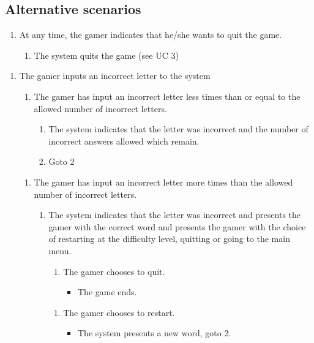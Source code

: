 \documentclass[12pt, letterpaper]{article}
\begin{document}
\subsection{Alternative scenarios}
\begin{enumerate}[label=a*.]
	\item At any time, the gamer indicates that he/she wants to quit the game.
	\begin{enumerate}[label=a*.1.]
		\item The system quits the game (see UC 3)
	\end{enumerate}
\end{enumerate}
\begin{enumerate}[label=3.1.]
	\item The gamer inputs an incorrect letter to the system
	\begin{enumerate}[label=3.1 a.]
		\item The gamer has input an incorrect letter less times than or equal to the allowed number of incorrect letters.
		\begin{enumerate}[label=3.1 a.\arabic*]
			\item The system indicates that the letter was incorrect and the number of incorrect answers allowed which remain.
			\item Goto 2
		\end{enumerate}
	\end{enumerate}
	\begin{enumerate}[label=3.1 b]
		\item The gamer has input an incorrect letter more times than the allowed number of incorrect letters. 
		
		\begin{enumerate}[label=3.1 b.\arabic*]
			\item The system indicates that the letter was incorrect and presents the gamer with the correct word and presents the gamer with the choice of restarting at the difficulty level, quitting or going to the main menu.
			\begin{enumerate}[label=3.1 b.1]
				\item The gamer chooses to quit.
				\begin{itemize}
					\item The game ends. 
				\end{itemize}

			\end{enumerate}
			\begin{enumerate}[label=3.1 b.2.]
				\item The gamer chooses to restart.
				\begin{itemize}
					\item The system presents a new word, goto 2.
				\end{itemize}
			\end{enumerate}
			

\end{enumerate}
\end{enumerate}
\end{enumerate}
\end{document}
